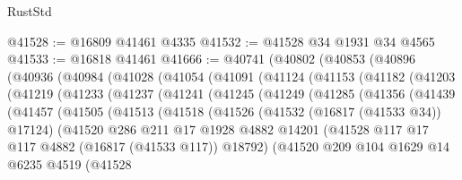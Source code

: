 \begin{lexlean}{RustStd}
\begin{coremodule}
{\begin{coremodule}
{{{{{{{{{{{{{{{{{{{{{{{{{{{{{{{{{{{{{{{{{{{{{{{{{{{{{{{@41528 := @16809 @41461 @4335
@41532 := @41528 @34 @1931 @34 @4565
@41533 := @16818 @41461
@41666 := @40741
    (@40802
      (@40853
        (@40896
          (@40936
            (@40984
              (@41028
                (@41054
                  (@41091
                    (@41124
                      (@41153
                        (@41182
                          (@41203
                            (@41219
                              (@41233
                                (@41237
                                  (@41241
                                    (@41245
                                      (@41249
                                        (@41285
                                          (@41356
                                            (@41439
                                              (@41457
                                                (@41505
                                                  (@41513
                                                    (@41518
                                                      (@41526
                                                        (@41532 (@16817 (@41533 @34)) @17124)
                                                        (@41520
                                                          @286
                                                          @211
                                                          @17
                                                          @1928
                                                          @4882
                                                          @14201
                                                          (@41528
                                                            @117
                                                            @17
                                                            @117
                                                            @4882
                                                            (@16817 (@41533 @117))
                                                            @18792)
                                                          (@41520
                                                            @209
                                                            @104
                                                            @1629
                                                            @14
                                                            @6235
                                                            @4519
                                                            (@41528
}}}}}}}}}}}}}}}}}}}}}}}}}}}}}}}}}}}}}}}}}}}}}}}}}}}}}}}
\end{coremodule}}
\end{coremodule}
\end{lexlean}
